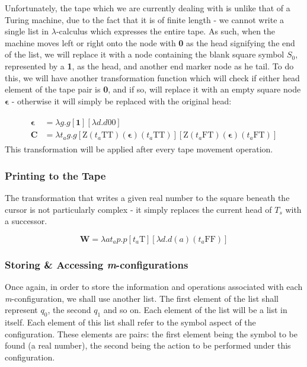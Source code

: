 \documentclass[Master.tex]{subfiles}
\begin{document}
Unfortunately, the tape which we are currently dealing with is unlike that of a Turing machine, due to the fact that it is of finite length - we cannot write a single list in $\lambda$-calculus which expresses the entire tape. As such, when the machine moves left or right onto the node with \textbf{0} as the head signifying the end of the list, we will replace it with a node containing the blank square symbol $S_0$, represented by a \textbf{1}, as the head, and another end marker node as he tail. To do this, we will have another transformation function which will check if either head element of the tape pair is \textbf{0}, and if so, will replace it with an empty square node $\bm{\epsilon}$ - otherwise it will simply be replaced with the original head:

\begin{gather*}
\begin{aligned}
\bm{\epsilon} &= \lambda g.g[\bm{\textbf{1}}][\lambda d.d\bm{\mathrm{0}}\bm{\mathrm{0}}] \\
\bm{C} &= \lambda t_a g.g[\bm{\mathrm{Z}}(t_a\bm{\mathrm{T}}\bm{\mathrm{T}})(\bm{\epsilon})(t_a\bm{\mathrm{T}}\bm{\mathrm{T}})][\bm{\mathrm{Z}}(t_a\bm{\mathrm{F}}\bm{\mathrm{T}})(\bm{\epsilon})(t_a\bm{\mathrm{F}}\bm{\mathrm{T}})]
\end{aligned}
\end{gather*}
This transformation will be applied after every tape movement operation.

\subsubsection{Printing to the Tape}

The transformation that writes a given real number to the square beneath the cursor is not particularly complex - it simply replaces the current head of $T_s$ with a successor.

\begin{equation*}
\bm{W} = \lambda a t_a p.p[t_a\bm{\mathrm{T}}][\lambda d.d(a)(t_a\bm{\mathrm{FF}})]
\end{equation*}

\subsubsection{Storing \& Accessing \textit{m}-configurations}
Once again, in order to store the information and operations associated with each \textit{m}-configuration, we shall use another list. The first element of the list shall represent $q_0$, the second $q_1$ and so on.
Each element of the list will be a list in itself. Each element of this list shall refer to the symbol aspect of the configuration. These elements are pairs: the first element being the symbol to be found (a real number), the second being the action to be performed under this configuration.
\end{document}
